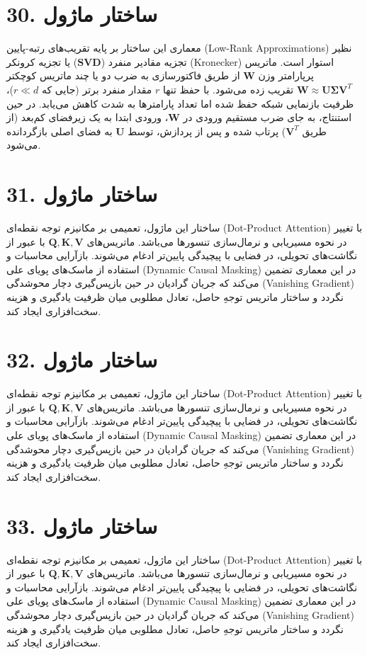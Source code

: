 \documentclass[12pt,a4paper]{report}
\begin{document}
\section*{30. ساختار ماژول }
معماری این ساختار بر پایه تقریب‌های رتبه-پایین (Low-Rank Approximations) نظیر تجزیه مقادیر منفرد ($\mathbf{SVD}$) یا تجزیه کرونکر (Kronecker) استوار است. ماتریس پرپارامتر وزن $\mathbf{W}$ از طریق فاکتورسازی به ضرب دو یا چند ماتریس کوچکتر $\mathbf{W} \approx \mathbf{U} \mathbf{\Sigma} \mathbf{V}^T$ تقریب زده می‌شود. با حفظ تنها $r$ مقدار منفرد برتر (جایی که $r \ll d$)، ظرفیت بازنمایی شبکه حفظ شده اما تعداد پارامترها به شدت کاهش می‌یابد. در حین استنتاج، به جای ضرب مستقیم ورودی در $\mathbf{W}$، ورودی ابتدا به یک زیرفضای کم‌بعد (از طریق $\mathbf{V}^T$) پرتاب شده و پس از پردازش، توسط $\mathbf{U}$ به فضای اصلی بازگردانده می‌شود.

\section*{31. ساختار ماژول }
ساختار این ماژول، تعمیمی بر مکانیزم توجه نقطه‌ای (Dot-Product Attention) با تغییر در نحوه مسیریابی و نرمال‌سازی تنسورها می‌باشد. ماتریس‌های $\mathbf{Q, K, V}$ با عبور از نگاشت‌های تحویلی، در فضایی با پیچیدگی پایین‌تر ادغام می‌شوند. بازآرایی محاسبات و استفاده از ماسک‌های پویای علی (Dynamic Causal Masking) در این معماری تضمین می‌کند که جریان گرادیان در حین بازپس‌گیری دچار محوشدگی (Vanishing Gradient) نگردد و ساختار ماتریس توجهِ حاصل، تعادل مطلوبی میان ظرفیت یادگیری و هزینه سخت‌افزاری ایجاد کند.

\section*{32. ساختار ماژول }
ساختار این ماژول، تعمیمی بر مکانیزم توجه نقطه‌ای (Dot-Product Attention) با تغییر در نحوه مسیریابی و نرمال‌سازی تنسورها می‌باشد. ماتریس‌های $\mathbf{Q, K, V}$ با عبور از نگاشت‌های تحویلی، در فضایی با پیچیدگی پایین‌تر ادغام می‌شوند. بازآرایی محاسبات و استفاده از ماسک‌های پویای علی (Dynamic Causal Masking) در این معماری تضمین می‌کند که جریان گرادیان در حین بازپس‌گیری دچار محوشدگی (Vanishing Gradient) نگردد و ساختار ماتریس توجهِ حاصل، تعادل مطلوبی میان ظرفیت یادگیری و هزینه سخت‌افزاری ایجاد کند.

\section*{33. ساختار ماژول }
ساختار این ماژول، تعمیمی بر مکانیزم توجه نقطه‌ای (Dot-Product Attention) با تغییر در نحوه مسیریابی و نرمال‌سازی تنسورها می‌باشد. ماتریس‌های $\mathbf{Q, K, V}$ با عبور از نگاشت‌های تحویلی، در فضایی با پیچیدگی پایین‌تر ادغام می‌شوند. بازآرایی محاسبات و استفاده از ماسک‌های پویای علی (Dynamic Causal Masking) در این معماری تضمین می‌کند که جریان گرادیان در حین بازپس‌گیری دچار محوشدگی (Vanishing Gradient) نگردد و ساختار ماتریس توجهِ حاصل، تعادل مطلوبی میان ظرفیت یادگیری و هزینه سخت‌افزاری ایجاد کند.
\end{document}
